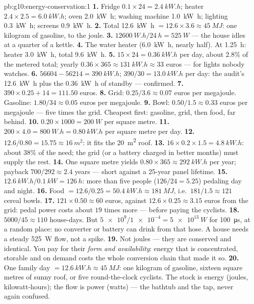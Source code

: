 \begin{solution}{pb:g10:energy-conservation:1}
\textbf{1.} Fridge $0.1 \times 24 = \qty{2.4}{kW.h}$; heater
$2.4 \times 2.5 = \qty{6.0}{kW.h}$; oven \qty{2.0}{kW.h}; washing
machine \qty{1.0}{kW.h}; lighting \qty{0.3}{kW.h}; screens
\qty{0.9}{kW.h}.
\textbf{2.} Total \qty{12.6}{kW.h} $= 12.6 \times 3.6 \approx
\qty{45}{MJ}$: one kilogram of gasoline, to the joule.
\textbf{3.} $\qty{12600}{W.h}/\qty{24}{h} = \qty{525}{W}$ --- the
house idles at a quarter of a kettle.
\textbf{4.} The water heater (\qty{6.0}{kW.h}, nearly half). At
\qty{1.25}{h}: heater \qty{3.0}{kW.h}, total \qty{9.6}{kW.h}.
\textbf{5.} $15 \times 24 = \qty{0.36}{kW.h}$ per day, about
$2.8\%$ of the metered total; yearly $0.36 \times 365 \approx
\qty{131}{kW.h} \approx 33$ euros --- for lights nobody watches.
\textbf{6.} $56604 - 56214 = \qty{390}{kW.h}$;
$390/30 = \qty{13.0}{kW.h}$ per day: the audit's \qty{12.6}{kW.h}
plus the \qty{0.36}{kW.h} of standby --- confirmed.
\textbf{7.} $390 \times 0.25 + 14 = 111.50$ euros.
\textbf{8.} Grid: $0.25/3.6 \approx 0.07$ euros per megajoule.
Gasoline: $1.80/34 \approx 0.05$ euros per megajoule.
\textbf{9.} Bowl: $0.50/1.5 \approx 0.33$ euros per megajoule ---
five times the grid. Cheapest first: gasoline, grid, then food,
far behind.
\textbf{10.} $0.20 \times 1000 = \qty{200}{W}$ per square metre.
\textbf{11.} $200 \times 4.0 = \qty{800}{W.h} = \qty{0.80}{kW.h}$
per square metre per day.
\textbf{12.} $12.6/0.80 = 15.75 \approx \qty{16}{m^2}$: it fits
the \qty{20}{m^2} roof.
\textbf{13.} $16 \times 0.2 \times 1.5 = \qty{4.8}{kW.h}$: about
$38\%$ of the need; the grid (or a battery charged in better
months) must supply the rest.
\textbf{14.} One square metre yields $0.80 \times 365 \approx
\qty{292}{kW.h}$ per year; payback $700/292 \approx 2.4$ years ---
short against a 25-year panel lifetime.
\textbf{15.} $\qty{12.6}{kW.h}/\qty{0.1}{kW} = \qty{126}{h}$:
more than five people ($126/24 = 5.25$) pedaling day and night.
\textbf{16.} Food $= 12.6/0.25 = \qty{50.4}{kW.h} \approx
\qty{181}{MJ}$, i.e.\ $181/1.5 \approx 121$ cereal bowls.
\textbf{17.} $121 \times 0.50 \approx 60$ euros, against
$12.6 \times 0.25 \approx 3.15$ euros from the grid: pedal power
costs about $19$ times more --- before paying the cyclists.
\textbf{18.} $5000/45 \approx 110$ house-days. But
$\num{5e9}/\num{1e-4} = \qty{5e13}{W}$ for \qty{100}{\micro s}, at
a random place: no converter or battery can drink from that hose.
A house needs a steady \qty{525}{W} flow, not a spike.
\textbf{19.} Not joules --- they are conserved and identical. You
pay for their \emph{form and availability}: energy that is
concentrated, storable and on demand costs the whole conversion
chain that made it so.
\textbf{20.} One family day $= \qty{12.6}{kW.h} \approx
\qty{45}{MJ}$: one kilogram of gasoline, sixteen square metres of
sunny roof, or five round-the-clock cyclists. The stock is energy
(joules, kilowatt-hours); the flow is power (watts) --- the bathtub
and the tap, never again confused.
\end{solution}

